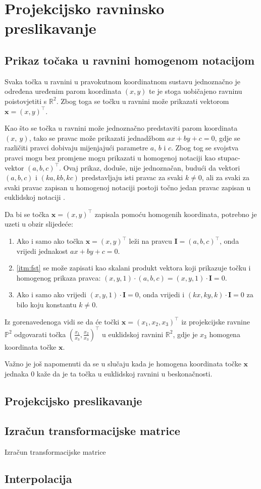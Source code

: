 \chapter{Projekcijsko ravninsko preslikavanje}

\section{Prikaz točaka u ravnini homogenom notacijom}

Svaka točka u ravnini u pravokutnom koordinatnom sustavu jednoznačno je određena uređenim parom koordinata $(x, y)$ te je stoga uobičajeno ravninu poistovjetiti s $\mathbb{R}^2$. Zbog toga se točku u ravnini može prikazati vektorom $\textbf{x} = (x, y)^\top$.

Kao što se točka u ravnini može jednoznačno predstaviti  parom koordinata $(x,~y)$, tako se pravac može prikazati jednadžbom $ax + by + c = 0$, gdje se različiti pravci dobivaju mijenjajući parametre $a$, $b$ i $c$. Zbog tog se svojstva pravci mogu bez promjene mogu prikazati u homogenoj notaciji kao stupac-vektor $(a, b, c)^\top$. Ovaj prikaz, doduše, nije jednoznačan, budući da vektori $(a, b, c)$ i $(ka, kb, kc)$ predstavljaju isti pravac za svaki $k \neq 0$, ali za svaki za svaki pravac zapisan u homogenoj notaciji postoji točno jedan pravac zapisan u euklidskoj notaciji \citep{Hartley2004}.

Da bi se točka $\textbf{x} = (x, y)^\top$ zapisala pomoću homogenih koordinata, potrebno je uzeti u obzir slijedeće:
\begin{enumerate}
	\item \label{itm:fst} Ako i samo ako točka $\textbf{x} = (x, y)^\top$ leži na pravcu $\textbf{I} =(a, b, c)^\top$, onda vrijedi jednakost $ax + by + c = 0$.
	\item \eqref{itm:fst}  se može zapisati kao skalani produkt vektora koji prikazuje točku i homogenog prikaza pravca: $(x, y, 1) \cdot (a, b, c) = (x, y, 1) \cdot \textbf{I} = 0$.
	\item Ako i samo ako vrijedi $(x, y, 1) \cdot \textbf{I} = 0$, onda vrijedi i  $(kx, ky, k) \cdot \textbf{I} = 0$ za bilo koju konstantu $k \neq 0$.
\end{enumerate}

Iz gorenavedenoga vidi se da će točki $\textbf{x} = (x_1, x_2, x_3)^\top$ iz projekcijske ravnine $\mathbb{P}^2$ odgovarati točka $(\frac{x_1}{x_3}, \frac{x_2}{x_3})^\top$ u euklidskoj ravnini $\mathbb{R}^2$, gdje je $x_3$ homogena koordinata točke $\textbf{x}$.

Važno je još napomenuti da se u slučaju kada je homogena koordinata točke $\textbf{x}$ jednaka $0$ kaže da je ta točka u euklidskoj ravnini u beskonačnosti.

\section{Projekcijsko preslikavanje}

\section{Izračun transformacijske matrice}
Izračun transformacijske matrice

\section{Interpolacija}